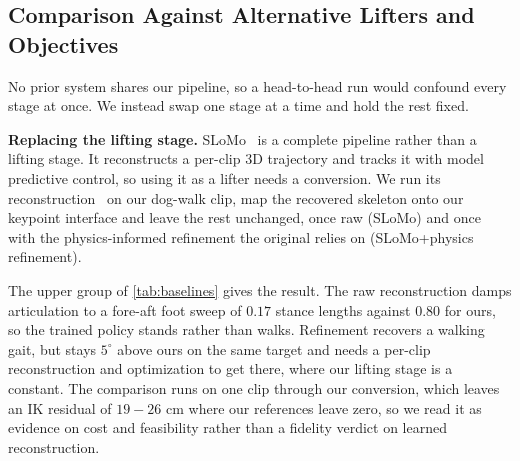 \documentclass[letterpaper, 10 pt, conference]{ieeeconf}
\begin{document}
\subsection{Comparison Against Alternative Lifters and Objectives}\label{subsec:exp-baselines}
\noindent
No prior system shares our pipeline, so a head-to-head run would confound every stage at once. We instead swap one stage at a time and hold the rest fixed.
 

\textbf{Replacing the lifting stage.}
SLoMo~\cite{zhang2023slomo} is a complete pipeline rather than a lifting stage. It reconstructs a per-clip 3D trajectory and tracks it with model predictive control, so using it as a lifter needs a conversion. We run its reconstruction~\cite{yang2023lab4d} on our dog-walk clip, map the recovered skeleton onto our keypoint interface and leave the rest unchanged, once raw (SLoMo) and once with the physics-informed refinement the original relies on (SLoMo+physics refinement).

The upper group of \autoref{tab:baselines} gives the result. The raw reconstruction damps articulation to a fore-aft foot sweep of $0.17$ stance lengths against $0.80$ for ours, so the trained policy stands rather than walks. Refinement recovers a walking gait, but stays $5^\circ$ above ours on the same target and needs a per-clip reconstruction and optimization to get there, where our lifting stage is a constant. The comparison runs on one clip through our conversion, which leaves an IK residual of $19-26$ cm where our references leave zero, so we read it as evidence on cost and feasibility rather than a fidelity verdict on learned reconstruction.



\end{document}
